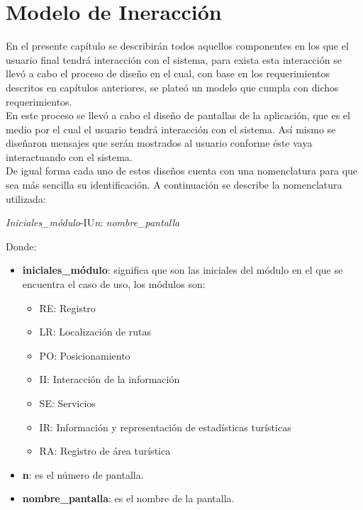 \chapter{Modelo de Ineracción}

En el presente capítulo se describirán todos aquellos componentes en los que el usuario final tendrá interacción con el sistema, para exista esta interacción se llevó a cabo el proceso de diseño en el cual, con base en los requerimientos descritos en capítulos anteriores, se plateó un modelo que cumpla con dichos requerimientos. \\

En este proceso se llevó a cabo el diseño de pantallas de la aplicación, que es el medio por el cual el usuario tendrá interacción con el sistema. Así mismo se diseñaron mensajes que serán mostrados al usuario conforme éste vaya interactuando con el sistema. \\

De igual forma cada uno de estos diseños cuenta con una nomenclatura para que sea más sencilla su identificación. A continuación se describe la nomenclatura utilizada: 

\begin{center}
	\Huge{\textit{Iniciales\_módulo}-IU\textit{n}: \textit{nombre\_pantalla}}
\end{center}

Donde: 

\begin{itemize}
	\item \textbf{iniciales\_módulo}: significa que son las iniciales del módulo en el que se encuentra el caso de uso, los módulos son: 
	\begin{itemize}
		\item RE: Registro
		\item LR: Localización de rutas
		\item PO: Posicionamiento
		\item II: Interacción de la información
		\item SE: Servicios
		\item IR: Información y representación de estadísticas turísticas
		\item RA: Registro de área turística
	\end{itemize}
	
	\item \textbf{n}: es el número de pantalla.
	
	\item \textbf{nombre\_pantalla}: es el nombre de la pantalla.
\end{itemize}

